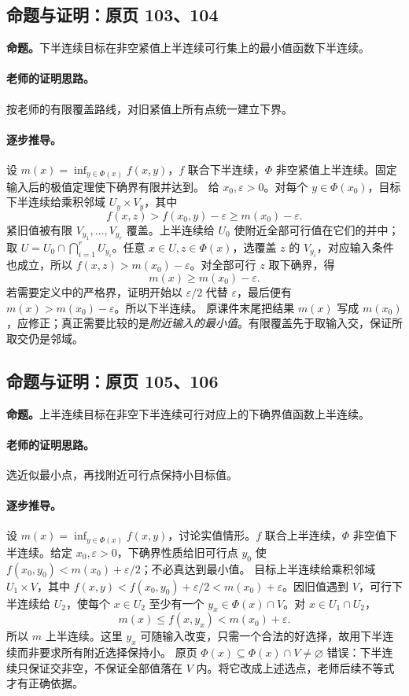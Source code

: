 \documentclass[11pt,a4paper]{article}
\newcommand{\eps}{\varepsilon}
\theoremstyle{definition}\newtheorem{definition}{定义}\newtheorem{example}{例}
\begin{document}
\subsection{命题与证明：原页 103、104}

\textbf{命题。}下半连续目标在非空紧值上半连续可行集上的最小值函数下半连续。

\paragraph{老师的证明思路。}按老师的有限覆盖路线，对旧紧值上所有点统一建立下界。

\paragraph{逐步推导。}
设 $m(x)=\inf_{y\in\Phi(x)}f(x,y)$，$f$ 联合下半连续，$\Phi$ 非空紧值上半连续。固定输入后的极值定理使下确界有限并达到。
给 $x_0,\eps>0$。对每个 $y\in\Phi(x_0)$，目标下半连续给乘积邻域 $U_y\times V_y$，其中
\[f(x,z)>f(x_0,y)-\eps\ge m(x_0)-\eps.\]
紧旧值被有限 $V_{y_1},\ldots,V_{y_r}$ 覆盖。上半连续给 $U_0$ 使附近全部可行值在它们的并中；取 $U=U_0\cap\bigcap_{i=1}^rU_{y_i}$。任意 $x\in U,z\in\Phi(x)$，选覆盖 $z$ 的 $V_{y_i}$，对应输入条件也成立，所以 $f(x,z)>m(x_0)-\eps$。对全部可行 $z$ 取下确界，得
\[m(x)\ge m(x_0)-\eps.\]
若需要定义中的严格界，证明开始以 $\eps/2$ 代替 $\eps$，最后便有 $m(x)>m(x_0)-\eps$。所以下半连续。
原课件末尾把结果 $m(x)$ 写成 $m(x_0)$，应修正；真正需要比较的是\emph{附近输入的最小值}。有限覆盖先于取输入交，保证所取交仍是邻域。


\subsection{命题与证明：原页 105、106}

\textbf{命题。}上半连续目标在非空下半连续可行对应上的下确界值函数上半连续。

\paragraph{老师的证明思路。}选近似最小点，再找附近可行点保持小目标值。

\paragraph{逐步推导。}
设 $m(x)=\inf_{y\in\Phi(x)}f(x,y)$，讨论实值情形。$f$ 联合上半连续，$\Phi$ 非空值下半连续。给定 $x_0,\eps>0$，下确界性质给旧可行点 $y_0$ 使 $f(x_0,y_0)<m(x_0)+\eps/2$；不必真达到最小值。
目标上半连续给乘积邻域 $U_1\times V$，其中 $f(x,y)<f(x_0,y_0)+\eps/2<m(x_0)+\eps$。因旧值遇到 $V$，可行下半连续给 $U_2$，使每个 $x\in U_2$ 至少有一个 $y_x\in\Phi(x)\cap V$。对 $x\in U_1\cap U_2$，
\[m(x)\le f(x,y_x)<m(x_0)+\eps.\]
所以 $m$ 上半连续。这里 $y_x$ 可随输入改变，只需一个合法的好选择，故用下半连续而非要求所有附近选择保持小。
原页 $\Phi(x)\subseteq\Phi(x)\cap V\ne\varnothing$ 错误：下半连续只保证交非空，不保证全部值落在 $V$ 内。将它改成上述选点，老师后续不等式才有正确依据。
\end{document}
